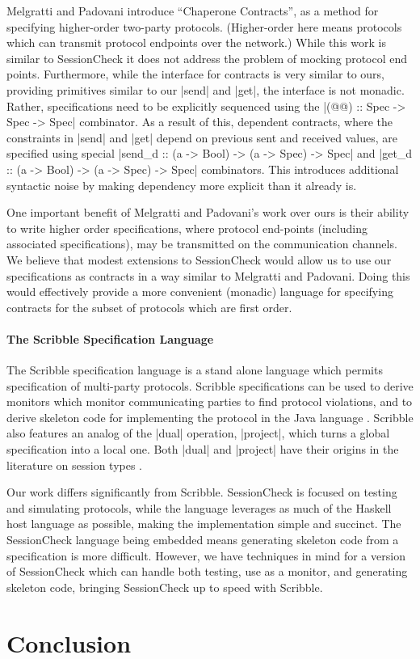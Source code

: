 \documentclass{article}
\begin{document}
Melgratti and Padovani \cite{ChaperoneContracts} introduce ``Chaperone
Contracts'', as a method for specifying higher-order two-party
protocols. (Higher-order here means protocols which can transmit
protocol endpoints over the network.)
%
While this work is similar to SessionCheck it does not address the problem
of mocking protocol end points.
%
Furthermore, while the interface for contracts is very similar to ours,
providing primitives similar to our |send| and |get|, the interface is not
monadic.
%
Rather, specifications need to be explicitly sequenced using the
|(@@) :: Spec -> Spec -> Spec| combinator.
%
As a result of this, dependent contracts, where the constraints in |send| and
|get| depend on previous sent and received values, are specified using
special |send_d :: (a -> Bool) -> (a -> Spec) -> Spec| and
|get_d :: (a -> Bool) -> (a -> Spec) -> Spec| combinators.
%
This introduces additional syntactic noise by making dependency more
explicit than it already is.

One important benefit of Melgratti and Padovani's work over ours is
their ability to write higher order specifications, where protocol
end-points (including associated specifications), may be transmitted
on the communication channels.
%
We believe that modest extensions to SessionCheck would allow us to
use our specifications as contracts in a way similar to Melgratti and
Padovani.
%
Doing this would effectively provide a more convenient (monadic)
language for specifying contracts for the subset of protocols which
are first order.
%

\paragraph{The Scribble Specification Language}
%
The Scribble specification language \cite{Scribble} is a stand alone language
which permits specification of multi-party protocols.
%
Scribble specifications can be used to derive monitors which monitor communicating
parties to find protocol violations, and to derive skeleton code for implementing
the protocol in the Java language \cite{Java}.
%
Scribble also features an analog of the |dual| operation, |project|, which turns a
global specification into a local one.
%
Both |dual| and |project| have their origins in the literature on session types
\cite{HondaSessionTypes, WadlerSessionTypes}.

Our work differs significantly from Scribble.
%
SessionCheck is focused on testing and simulating protocols, while the language
leverages as much of the Haskell host language as possible, making the implementation
simple and succinct.
%
The SessionCheck language being embedded means generating skeleton code from a
specification is more difficult.
%
However, we have techniques in mind for a version of SessionCheck which can handle
both testing, use as a monitor, and generating skeleton code, bringing SessionCheck
up to speed with Scribble.
%

\section{Conclusion}




\end{document}
